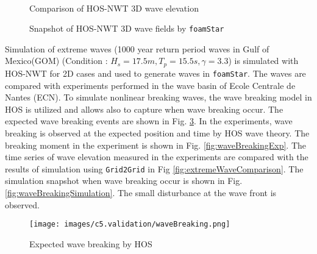 	\pagebreak
	
	{
		\begin{figure} [H]
			\centering
			 \\
			\vspace{0.2cm}
			\caption{Comparison of HOS-NWT 3D wave elevation}
			\label{fig:HOSNWT_3DWaveElevation}
		\end{figure}
	}
	
	{
		\begin{figure} [H]
			\centering
			 \quad
			\vspace{0.2cm}
			\caption{Snapshot of HOS-NWT 3D wave fields by \texttt{foamStar}}
			\label{fig:HOSNWT_3DSnapshot}
		\end{figure}
	}
	
	\pagebreak
	
	Simulation of extreme waves (1000 year return period waves in Gulf of Mexico(GOM) (Condition : $H_s=17.5 m, T_p=15.5 s, \gamma=3.3$) is simulated with HOS-NWT for 2D cases and used to generate waves in \texttt{foamStar}. The waves are compared with experiments performed in the wave basin of Ecole Centrale de Nantes (ECN). To simulate nonlinear breaking waves, the wave breaking model in HOS is utilized and allows also to capture when wave breaking occur. The expected wave breaking events are shown in Fig. \ref{fig:waveBreakingEvents}. In the experiments, wave breaking is observed at the expected position and time by HOS wave theory. The breaking moment in the experiment is shown in Fig. \ref{fig:waveBreakingExp}. The time series of wave elevation measured in the experiments are compared with the results of simulation using \texttt{Grid2Grid} in Fig \ref{fig:extremeWaveComparison}. The simulation snapshot when wave breaking occur is shown in Fig. \ref{fig:waveBreakingSimulation}. The small disturbance at the wave front is observed.
	
	{
		\begin{figure} [H]
			\centering
			\texttt{[image: images/c5.validation/waveBreaking.png]}
			\caption{Expected wave breaking by HOS}
			\label{fig:waveBreakingEvents}
		\end{figure}
	}

